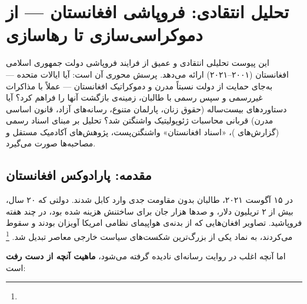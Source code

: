 \chapter{تحلیل انتقادی: فروپاشی افغانستان — از دموکراسی‌سازی تا رهاسازی}
\label{app:afghanistan}

\begin{tcolorbox}[mybox, title={چکیده‌ی پیوست}]
این پیوست تحلیلی انتقادی و عمیق از فرایند فروپاشی دولت جمهوری اسلامی افغانستان (۲۰۰۱–۲۰۲۱) ارائه می‌دهد. پرسش محوری آن است: آیا ایالات متحده — به‌جای حمایت از دولت نسبتاً مدرن و دموکراتیک افغانستان — عملاً با مذاکرات غیررسمی و سپس رسمی با طالبان، زمینه‌ی بازگشت آنها را فراهم کرد؟ آیا دستاوردهای بیست‌ساله (حقوق زنان، پارلمان متنوع، رسانه‌های آزاد، قانون اساسی مدرن) قربانی محاسبات ژئوپولیتیک واشنگتن شد؟ تحلیل بر مبنای اسناد رسمی (گزارش‌های )، «اسناد افغانستان» واشنگتن‌پست، پژوهش‌های آکادمیک مستقل و مصاحبه‌ها صورت می‌گیرد.
\end{tcolorbox}

\section{مقدمه: پارادوکس افغانستان}
\label{sec:app-afg-intro}

در ۱۵ آگوست ۲۰۲۱، طالبان بدون مقاومت جدی وارد کابل شدند. دولتی که ۲۰ سال، بیش از ۲ تریلیون دلار، و صدها هزار جان برای ساختنش هزینه شده بود، در چند هفته فروپاشید. تصاویر افغان‌هایی که از بدنه‌ی هواپیمای نظامی امریکا آویزان بودند و سقوط می‌کردند، به نماد یکی از بزرگ‌ترین شکست‌های سیاست خارجی معاصر تبدیل شد.%
\footnote{}

اما آنچه اغلب در روایت رسانه‌ای نادیده گرفته می‌شود، \textbf{ماهیت آنچه از دست رفت} است:

